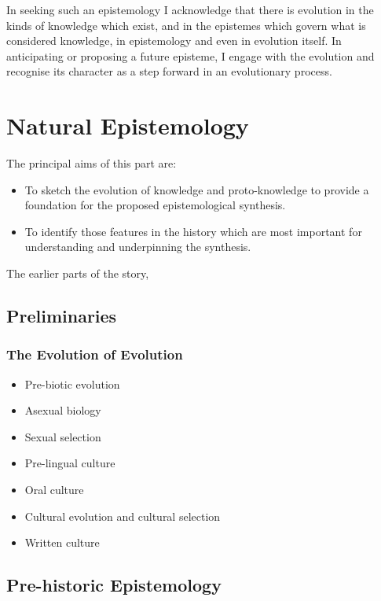 \documentclass[10pt,titlepage]{book}
\begin{document}
In seeking such an epistemology I acknowledge that there is evolution in the kinds of knowledge which exist, and in the epistemes which govern what is considered knowledge, in epistemology and even in evolution itself.
In anticipating or proposing a future episteme, I engage with the evolution and recognise its character as a step forward in an evolutionary process.

\part{Natural Epistemology}

The principal aims of this part are:

\begin{itemize}
\item To sketch the evolution of knowledge and proto-knowledge to provide a foundation for the proposed epistemological synthesis.
\item To identify those features in the history which are most important for understanding and underpinning the synthesis.
\end{itemize}

The earlier parts of the story, 

\chapter{Preliminaries}

\section{The Evolution of Evolution}

\begin{itemize}
\item Pre-biotic evolution
\item Asexual biology
\item Sexual selection
\item Pre-lingual culture
\item Oral culture
\item Cultural evolution and cultural selection
\item Written culture
\end{itemize}

\chapter{Pre-historic Epistemology}

\chapter{}
\end{document}
